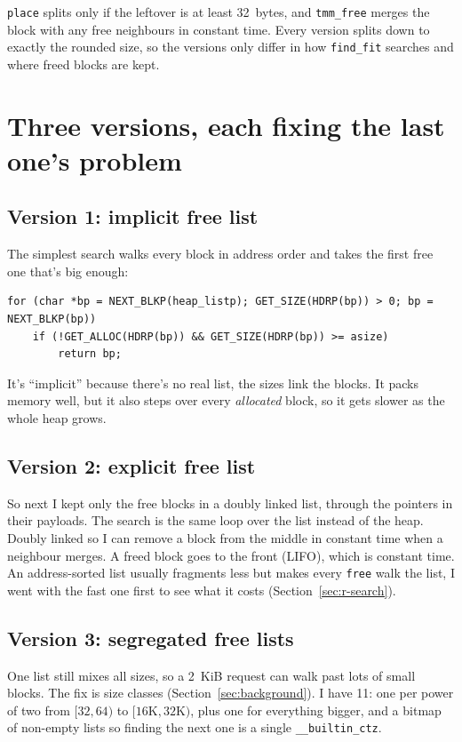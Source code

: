 \documentclass[11pt,letterpaper]{article}
\begin{document}
\texttt{place} splits only if the leftover is at least 32~bytes, and \texttt{tmm\_free} merges the block with any free neighbours in constant time. Every version splits down to exactly the rounded size, so the versions only differ in how \texttt{find\_fit} searches and where freed blocks are kept.

\section{Three versions, each fixing the last one's problem}
\label{sec:versions}

\subsection*{Version 1: implicit free list}

The simplest search walks every block in address order and takes the first free one that's big enough:

\begin{lstlisting}
for (char *bp = NEXT_BLKP(heap_listp); GET_SIZE(HDRP(bp)) > 0; bp = NEXT_BLKP(bp))
	if (!GET_ALLOC(HDRP(bp)) && GET_SIZE(HDRP(bp)) >= asize)
		return bp;
\end{lstlisting}

It's ``implicit'' because there's no real list, the sizes link the blocks. It packs memory well, but it also steps over every \emph{allocated} block, so it gets slower as the whole heap grows.

\subsection*{Version 2: explicit free list}

So next I kept only the free blocks in a doubly linked list, through the pointers in their payloads. The search is the same loop over the list instead of the heap. Doubly linked so I can remove a block from the middle in constant time when a neighbour merges. A freed block goes to the front (LIFO), which is constant time. An address-sorted list usually fragments less but makes every \texttt{free} walk the list, I went with the fast one first to see what it costs (Section~\ref{sec:r-search}).

\subsection*{Version 3: segregated free lists}

One list still mixes all sizes, so a 2~KiB request can walk past lots of small blocks. The fix is size classes (Section~\ref{sec:background}). I have 11: one per power of two from $[32,64)$ to $[16\text{K},32\text{K})$, plus one for everything bigger, and a bitmap of non-empty lists so finding the next one is a single \texttt{\_\_builtin\_ctz}.
\end{document}
